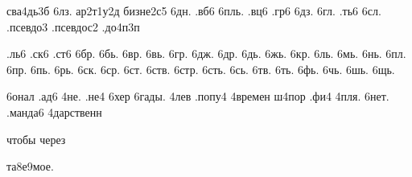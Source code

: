 
сва4дь3б	%
6лз.		%
ар2т1у2д	%
бизне2с5	%
6дн.		%
.вб6		%
6пль.		%
.вц6		%
.гр6		%
6дз.		%
6гл.		%
.ть6		%
6сл.		%
.псевдо3	%
.псевдос2	%
.до4п3п		%

.ль6		%
.ск6		%
.ст6		%
6бр.		%
6бь.		%
6вр.		%
6вь.		%
6гр.		%
6дж.		%
6др.		%
6дь.		%
6жь.		%
6кр.		%
6ль.		%
6мь.		%
6нь.		%
6пл.		%
6пр.		%
6пь.		%
6рь.		%
6ск.		%
6ср.		%
6ст.		%
6ств.		%
6стр.		%
6сть.		%
6сь.		%
6тв.		%
6ть.		%
6фь.		%
6чь.		%
6шь.		%
6щь.		%




6онал		%
.ад6		%
4не.		%
.не4		%
6хер		%
6гады.		%
4лев		%
.попу4		%
4времен		%
ш4пор		%
.фи4	        %
4пля.		%
6нет.		%
.манда6		%
4дарственн	%

чтобы
через




та8е9мое.   %
